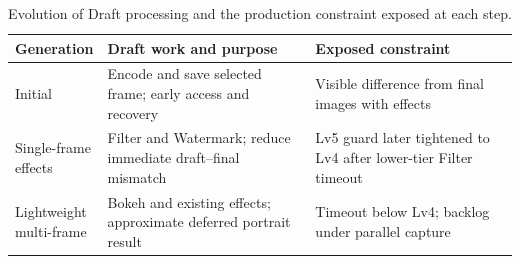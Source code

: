 \begin{table}[H]
  \centering
  \caption{Evolution of Draft processing and the production constraint
  exposed at each step.}
  \label{tab:draft-evolution}
  {\footnotesize
  \setlength{\tabcolsep}{3pt}
  \begin{tabular}{>{\raggedright\arraybackslash}p{1.75cm}|
    >{\raggedright\arraybackslash}p{2.80cm}|
    >{\raggedright\arraybackslash}p{2.90cm}}
    \toprule \midrule
    \textbf{Generation} & \textbf{Draft work and purpose} &
      \textbf{Exposed constraint} \\
    \midrule \midrule
    Initial & Encode and save selected frame; early access and recovery &
      Visible difference from final images with effects \\
    \midrule
    \makecell[l]{Single-frame\\effects} & Filter and Watermark; reduce
      immediate draft--final mismatch & Lv5 guard later tightened to Lv4
      after lower-tier Filter timeout \\
    \midrule
    \makecell[l]{Lightweight\\multi-frame} & Bokeh and existing effects;
      approximate deferred portrait result & Timeout below Lv4; backlog
      under parallel capture \\
    \midrule \bottomrule
  \end{tabular}
  }
\end{table}
